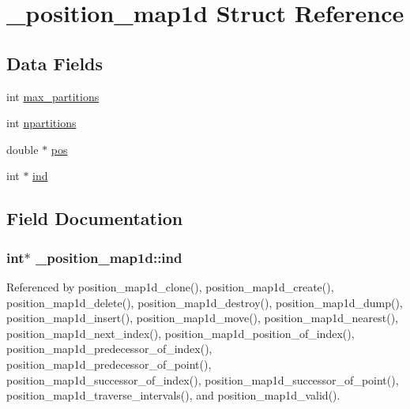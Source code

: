 \hypertarget{struct__position__map1d}{}\section{\+\_\+position\+\_\+map1d Struct Reference}
\label{struct__position__map1d}
\subsection*{Data Fields}
\begin{DoxyCompactItemize}
\item 
int \hyperlink{struct__position__map1d_a4a3ba1f1a0f8c473d8d7dab7de81c16a}{max\+\_\+partitions}
\item 
int \hyperlink{struct__position__map1d_a59a27bbd2a0c5aba2f98e3d36db9e56d}{npartitions}
\item 
double $\ast$ \hyperlink{struct__position__map1d_a6931615dd68687e44bf885a383b7d7db}{pos}
\item 
int $\ast$ \hyperlink{struct__position__map1d_a4504c5f02051ba3195f6b98c8b9e1b94}{ind}
\end{DoxyCompactItemize}


\subsection{Field Documentation}
\subsubsection[{\texorpdfstring{ind}{ind}}]{\setlength{\rightskip}{0pt plus 5cm}int$\ast$ \+\_\+position\+\_\+map1d\+::ind}\hypertarget{struct__position__map1d_a4504c5f02051ba3195f6b98c8b9e1b94}{}\label{struct__position__map1d_a4504c5f02051ba3195f6b98c8b9e1b94}


Referenced by position\+\_\+map1d\+\_\+clone(), position\+\_\+map1d\+\_\+create(), position\+\_\+map1d\+\_\+delete(), position\+\_\+map1d\+\_\+destroy(), position\+\_\+map1d\+\_\+dump(), position\+\_\+map1d\+\_\+insert(), position\+\_\+map1d\+\_\+move(), position\+\_\+map1d\+\_\+nearest(), position\+\_\+map1d\+\_\+next\+\_\+index(), position\+\_\+map1d\+\_\+position\+\_\+of\+\_\+index(), position\+\_\+map1d\+\_\+predecessor\+\_\+of\+\_\+index(), position\+\_\+map1d\+\_\+predecessor\+\_\+of\+\_\+point(), position\+\_\+map1d\+\_\+successor\+\_\+of\+\_\+index(), position\+\_\+map1d\+\_\+successor\+\_\+of\+\_\+point(), position\+\_\+map1d\+\_\+traverse\+\_\+intervals(), and position\+\_\+map1d\+\_\+valid().

